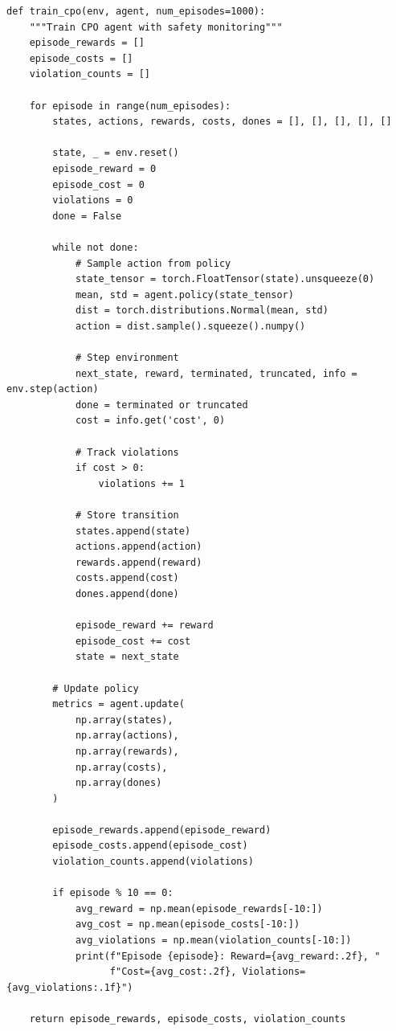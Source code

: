 \documentclass[12pt]{article}
\begin{document}
{{{{\begin{verbatim}
def train_cpo(env, agent, num_episodes=1000):
    """Train CPO agent with safety monitoring"""
    episode_rewards = []
    episode_costs = []
    violation_counts = []

    for episode in range(num_episodes):
        states, actions, rewards, costs, dones = [], [], [], [], []
        
        state, _ = env.reset()
        episode_reward = 0
        episode_cost = 0
        violations = 0
        done = False

        while not done:
            # Sample action from policy
            state_tensor = torch.FloatTensor(state).unsqueeze(0)
            mean, std = agent.policy(state_tensor)
            dist = torch.distributions.Normal(mean, std)
            action = dist.sample().squeeze().numpy()

            # Step environment
            next_state, reward, terminated, truncated, info = env.step(action)
            done = terminated or truncated
            cost = info.get('cost', 0)
            
            # Track violations
            if cost > 0:
                violations += 1

            # Store transition
            states.append(state)
            actions.append(action)
            rewards.append(reward)
            costs.append(cost)
            dones.append(done)

            episode_reward += reward
            episode_cost += cost
            state = next_state

        # Update policy
        metrics = agent.update(
            np.array(states),
            np.array(actions),
            np.array(rewards),
            np.array(costs),
            np.array(dones)
        )

        episode_rewards.append(episode_reward)
        episode_costs.append(episode_cost)
        violation_counts.append(violations)

        if episode % 10 == 0:
            avg_reward = np.mean(episode_rewards[-10:])
            avg_cost = np.mean(episode_costs[-10:])
            avg_violations = np.mean(violation_counts[-10:])
            print(f"Episode {episode}: Reward={avg_reward:.2f}, "
                  f"Cost={avg_cost:.2f}, Violations={avg_violations:.1f}")

    return episode_rewards, episode_costs, violation_counts
\end{verbatim}

}}}}
\end{document}

